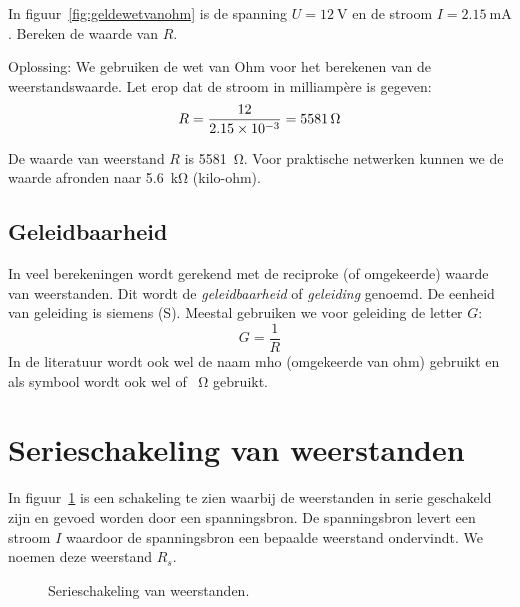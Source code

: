 \begin{example}
In figuur~\ref{fig:geldewetvanohm} is de spanning $U=\SI{12}{\volt}$ en de stroom $I=\SI{2.15}{\milli\ampere}$.
Bereken de waarde van $R$.

Oplossing: We gebruiken de wet van Ohm voor het berekenen van de weerstandswaarde. Let erop dat de stroom in milliampère is gegeven:
\begin{equation}
R = \dfrac{12}{\num{2.15d-3}} = \SI{5581}{\ohm} 
\end{equation}

De waarde van weerstand $R$ is \SI{5581}{\ohm}. Voor praktische netwerken kunnen we de waarde afronden
naar \SI{5.6}{\kilo\ohm} (kilo-ohm).
\end{example}

\subsection{Geleidbaarheid}
In veel berekeningen wordt gerekend met de reciproke (of omgekeerde) waarde van weerstanden. Dit wordt
de \textsl{geleidbaarheid} of \textsl{geleiding} genoemd. De eenheid van geleiding is siemens (\si{\siemens}).
Meestal gebruiken we voor geleiding de letter $G$:
\begin{equation}
\label{equ:geleiding}
G = \dfrac{1}{R}
\end{equation}
In de literatuur wordt ook wel de naam mho (omgekeerde van ohm) gebruikt en als symbool wordt ook wel \si{\mho} of \si{\per\ohm} gebruikt.


\section{Serieschakeling van weerstanden}
In figuur~\ref{fig:gelserieschakelingweerstanden} is een schakeling te zien waarbij de weerstanden
in serie geschakeld zijn en gevoed worden door een spanningsbron. De spanningsbron levert een stroom
$I$ waardoor de spanningsbron een bepaalde weerstand ondervindt. We noemen deze weerstand $R_s$.

\begin{figure}[!ht]
\centering
{}
\caption{Serieschakeling van weerstanden.}
\label{fig:gelserieschakelingweerstanden}
\end{figure}

